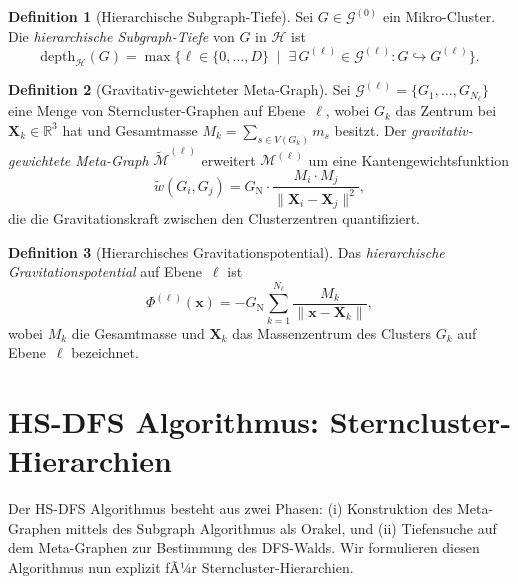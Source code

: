 ﻿\documentclass[a4paper,12pt]{report}
\theoremstyle{definition}
\newtheorem{definition}{Definition}
\begin{document}
\begin{definition}[Hierarchische Subgraph-Tiefe]
\label{def:hier_tiefe}
Sei $G \in \mathcal{G}^{(0)}$ ein Mikro-Cluster. Die \emph{hierarchische Subgraph-Tiefe} von $G$ in $\mathcal{H}$ ist
\[
\mathrm{depth}_\mathcal{H}(G) = \max\bigl\{\ell \in \{0,\ldots,D\} \;\mid\;
\exists\, G^{(\ell)} \in \mathcal{G}^{(\ell)} \colon G \hookrightarrow G^{(\ell)}\bigr\}.
\]
\end{definition}

\begin{definition}[Gravitativ-gewichteter Meta-Graph]
\label{def:gravmeta}
Sei $\mathcal{G}^{(\ell)} = \{G_1,\ldots,G_{N_\ell}\}$ eine Menge von Sterncluster-Graphen auf Ebene~$\ell$, wobei $G_k$ das Zentrum bei $\mathbf{X}_k \in \mathbb{R}^3$ hat und Gesamtmasse $M_k = \sum_{s \in V(G_k)} m_s$ besitzt. Der \emph{gravitativ-gewichtete Meta-Graph} $\tilde{\mathcal{M}}^{(\ell)}$ erweitert $\mathcal{M}^{(\ell)}$ um eine Kantengewichtsfunktion
\[
\tilde{w}(G_i, G_j) = G_\mathrm{N} \cdot \frac{M_i \cdot M_j}{\|\mathbf{X}_i - \mathbf{X}_j\|^2},
\]
die die Gravitationskraft zwischen den Clusterzentren quantifiziert.
\end{definition}

\begin{definition}[Hierarchisches Gravitationspotential]
\label{def:hier_potential}
Das \emph{hierarchische Gravitationspotential} auf Ebene~$\ell$ ist
\[
\Phi^{(\ell)}(\mathbf{x}) = -G_\mathrm{N} \sum_{k=1}^{N_\ell}
\frac{M_k}{\|\mathbf{x} - \mathbf{X}_k\|},
\]
wobei $M_k$ die Gesamtmasse und $\mathbf{X}_k$ das Massenzentrum des Clusters $G_k$ auf Ebene~$\ell$ bezeichnet.
\end{definition}

\section{HS-DFS Algorithmus: Sterncluster-Hierarchien}
\label{ssec:hsdfs_algo}

Der HS-DFS Algorithmus \cite{epp2026msubgraph} besteht aus zwei Phasen: (i) Konstruktion des Meta-Graphen mittels des Subgraph Algorithmus als Orakel, und (ii) Tiefensuche auf dem Meta-Graphen zur Bestimmung des DFS-Walds. Wir formulieren diesen Algorithmus nun explizit fÃ¼r Sterncluster-Hierarchien.
\end{document}
